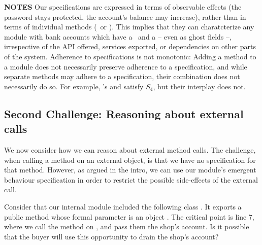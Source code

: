  
 \noindent
\textbf{NOTES} \notesep  Our specifications are expressed in terms of observable effects (\eg the password stays protected, the account's balance may increase), rather than in terms of individual methods (\eg\,  or ).
{This %
implies that they can charatcterize  any 
module with bank accounts which have a %
 \balance~and a \password -- even as ghost fields --}, irrespective of the API offered, services  exported, or  dependencies on other parts of the system.
\notesep
{Adherence to   specifications is not monotonic:
Adding a method to a module does not necessarily preserve adherence to
a specification, and while separate methods may adhere to a  specification, their combination does
not necessarily do so. 
{For example, \ModB's   and  satisfy $S_4$, but their interplay does not.}
}

 
\subsection{Second Challenge: Reasoning about external calls}
\label{sec:how}

{We now consider how we can reason about external method calls. 
The challenge, when calling a method on an external object, is that we have no specification for that method. 
However, as argued in the intro, we can use our  module's emergent behaviour  specification   in order to restrict the possible side-effects of the external call.
}

 
 
Consider that {our internal module included the following class} . It exports a public method  whose formal parameter  is an   object . 
The critical point is line 7, where we call the method on , and pass them the shop's account.
Is it possible that the buyer will use this opportunity  to drain the shop's account?
 




%
 

